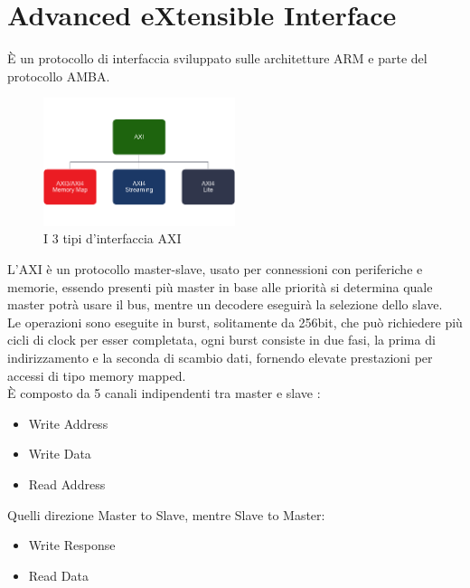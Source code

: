 \section{Advanced eXtensible Interface}
È un protocollo di interfaccia sviluppato sulle architetture ARM e parte del protocollo AMBA.
\begin{figure}
    \centering
    \includegraphics[width=0.5\textwidth]{images/AXI1.png}
    \caption{I 3 tipi d'interfaccia AXI}
    \label{fig:my_label}
\end{figure}
L'AXI è un protocollo master-slave, usato per connessioni con periferiche e memorie, essendo presenti più master in base alle priorità si determina quale master potrà usare il bus, mentre un decodere eseguirà la selezione dello slave.\\
Le operazioni sono eseguite in burst, solitamente da 256bit, che può richiedere più cicli di clock per esser completata, ogni burst consiste in due fasi, la prima di indirizzamento e la seconda di scambio dati, fornendo elevate prestazioni per accessi di tipo memory mapped.\\
È composto da 5 canali indipendenti tra master e slave\cite{AXI} :
\begin{itemize}
    \item Write Address 
    \item Write Data
    \item Read Address
\end{itemize}
Quelli direzione Master to Slave, mentre Slave to Master:
\begin{itemize}
    \item Write Response
    \item Read Data
\end{itemize}\clearpage
